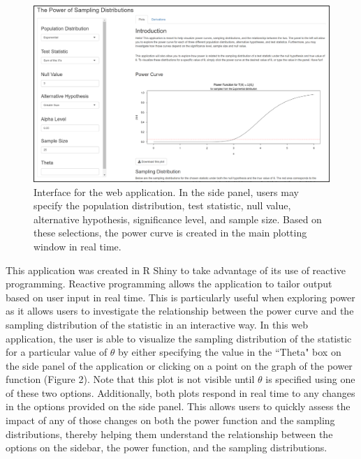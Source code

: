 \documentclass{TISE}
\begin{document}
\begin{figure}[H]
	\centering
	\includegraphics[width=\linewidth]{fig1.png}
	\caption{Interface for the web application. In the side panel, users may specify the population distribution, test statistic, null value, alternative hypothesis, significance level, and sample size. Based on these selections, the power curve is created in the main plotting window in real time.}
\end{figure}

This application was created in {\sf R} Shiny to take advantage of its use of reactive programming. Reactive programming allows the application to tailor output based on user input in real time. This is particularly useful when exploring power as it allows users to investigate the relationship between the power curve and the sampling distribution of the statistic in an interactive way. In this web application, the user is able to visualize the sampling distribution of the statistic for a particular value of $\theta$ by either specifying the value in the ``Theta" box on the side panel of the application or clicking on a point on the graph of the power function (Figure 2). Note that this plot is not visible until $\theta$ is specified using one of these two options. Additionally, both plots respond in real time to any changes in the options provided on the side panel. This allows users to quickly assess the impact of any of those changes on both the power function and the sampling distributions, thereby helping them understand the relationship between the options on the sidebar, the power function, and the sampling distributions. 
\end{document}
